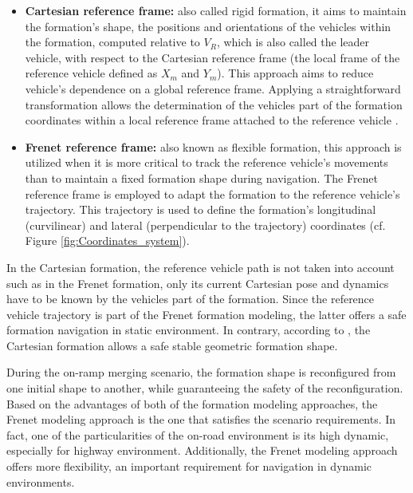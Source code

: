 \begin{itemize}
\begin{itemize}
    \item \textbf{Cartesian reference frame:} also called rigid formation, it aims to maintain the formation's shape, the positions and orientations of the vehicles within the formation, computed relative to $V_{R}$, which is also called the leader vehicle, with respect to the Cartesian reference frame (the local frame of the reference vehicle defined as $X_m$ and $Y_m$). This approach aims to reduce vehicle's dependence on a global reference frame. Applying a straightforward transformation allows the determination of the vehicles part of the formation coordinates within a local reference frame attached to the reference vehicle \cite{mariottini2007leader}\cite{benzerrouk2010navigation}.

    \item \textbf{Frenet reference frame:} \label{sec:FrenetFrame} also known as flexible formation, this approach is utilized when it is more critical to track the reference vehicle's movements than to maintain a fixed formation shape during navigation. The Frenet reference frame is employed to adapt the formation to the reference vehicle's trajectory. This trajectory is used to define the formation's longitudinal (curvilinear) and lateral (perpendicular to the trajectory) coordinates \cite{8430659}\cite{avanzini2010urban}\cite{klanvcar2011control} (cf. Figure \ref{fig:Coordinates_system}).
\end{itemize}








In the Cartesian formation, the reference vehicle path is not taken into account such as in the Frenet formation, only its current Cartesian pose and dynamics have to be known by the vehicles part of the formation. Since the reference vehicle trajectory is part of the Frenet formation modeling, the latter offers a safe formation navigation in static environment. In contrary, according to \cite{8430659}, the Cartesian formation allows a safe stable geometric formation shape. 

During the on-ramp merging scenario, the formation shape is reconfigured from one initial shape to another, while guaranteeing the safety of the reconfiguration. Based on the advantages of both of the formation modeling approaches, the Frenet modeling approach is the one that satisfies the scenario requirements. In fact, one of the particularities of the on-road environment is its high dynamic, especially for highway environment. Additionally, the Frenet modeling approach offers more flexibility, an important requirement for navigation in dynamic environments. 


\end{itemize}
